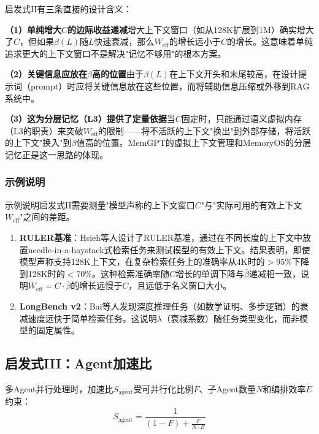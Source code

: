 启发式II有三条直接的设计含义：

\textbf{（1）单纯增大$C$的边际收益递减}增大上下文窗口（如从128K扩展到1M）确实增大了$C$，但如果$\beta(L)$随$L$快速衰减，那么$W_{\mathrm{eff}}$的增长远小于$C$的增长。这意味着单纯追求更大的上下文窗口不是解决"记忆不够用"的根本方案。

\textbf{（2）关键信息应放在$\beta$高的位置}由于$\beta(L)$在上下文开头和末尾较高，在设计提示词（prompt）时应将关键信息放在这些位置，而将辅助信息压缩或外移到RAG系统中。

\textbf{（3）这为分层记忆（L3）提供了定量依据}当$C$固定时，只能通过语义虚拟内存（L3的职责）来突破$W_{\mathrm{eff}}$的限制——将不活跃的上下文"换出"到外部存储，将活跃的上下文"换入"到$\beta$值高的位置。MemGPT的虚拟上下文管理\cite{memgpt2023}和MemoryOS的分层记忆\cite{memoryos2025}正是这一思路的体现。

\subsubsection{示例说明}

示例说明启发式II需要测量"模型声称的上下文窗口$C$"与"实际可用的有效上下文$W_{\mathrm{eff}}$"之间的差距。

\begin{enumerate}[nosep]
\item \textbf{RULER基准}：Hsieh等人设计了RULER基准，通过在不同长度的上下文中放置needle-in-a-haystack式检索任务来测试模型的有效上下文\cite{ruler2024}。结果表明，即使模型声称支持128K上下文，在复杂检索任务上的准确率从4K时的$>$95\%下降到128K时的$<$70\%。这种检索准确率随$C$增长的单调下降与$\bar{\beta}$递减相一致，说明$W_{\mathrm{eff}} = C \cdot \bar{\beta}$的增长远慢于$C$，且远低于名义窗口大小。

\item \textbf{LongBench v2}：Bai等人发现深度推理任务（如数学证明、多步逻辑）的衰减速度远快于简单检索任务\cite{longbenchv2_2024}。这说明$\lambda$（衰减系数）随任务类型变化，而非模型的固定属性。
\end{enumerate}

\subsection{启发式III：Agent加速比}
\label{sec:law3}

\begin{heuristic}[Agent加速比]
多Agent并行处理时，加速比$S_{\mathrm{agent}}$受可并行化比例$F$、子Agent数量$N$和编排效率$E$约束：
\begin{equation}
\label{eq:agent}
S_{\mathrm{agent}} = \frac{1}{(1-F) + \frac{F}{N \cdot E}}
\end{equation}
\end{heuristic}

